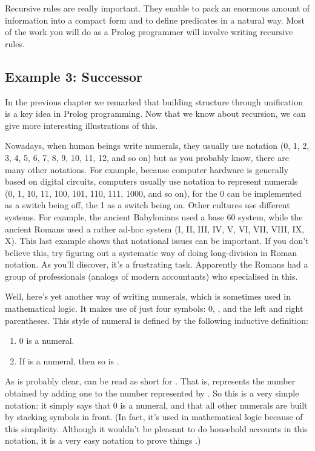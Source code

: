 Recursive rules are really important. They enable to pack an enormous
amount of information into a compact form and to define predicates in
a natural way.  Most of the work you will do as a Prolog programmer
will involve writing recursive rules.

\subsection*{Example 3: Successor}\label{SUBSEC.L3.EX3}



In the previous chapter we remarked that building structure through
unification is a key idea in Prolog programming.  Now that we know
about recursion, we can give more interesting illustrations of this.

Nowadays, when human beings write numerals, they usually use
 notation (0, 1, 2, 3, 4, 5, 6, 7, 8, 9, 10, 11, 12, and
so on) but as you probably know, there are many other notations.  For
example, because computer hardware is generally based on digital
circuits, computers usually use  notation to represent
numerals (0, 1, 10, 11, 100, 101, 110, 111, 1000, and so on), for the
0 can be implemented as a switch being off, the 1 as a switch being
on.  Other cultures use different systems.  For example, the
ancient Babylonians used a base 60 system, while the ancient Romans
used a rather ad-hoc system (I, II, III, IV, V, VI, VII, VIII, IX, X).
This last example shows that notational issues can be important.  If
you don't believe this, try figuring out a systematic way of doing
long-division in Roman notation.  As you'll discover, it's a
frustrating task.  Apparently the Romans had a group of professionals
(analogs of modern accountants) who specialised in this.

Well, here's yet another way of writing numerals, which is
sometimes used in mathematical logic.  It makes use of just four
symbols: 0, , and the left and right parentheses.  This style
of numeral is defined by the following inductive definition:
\begin{enumerate}
\item{}0 is a numeral.

\item{}If  is a numeral, then so is .
\end{enumerate}


As is probably clear,  can be read as short for
. That is,  represents the number obtained by
adding one to the number represented by .  So this is a very
simple notation: it simply says that 0 is a numeral, and that all
other numerals are built by stacking  symbols in front.  (In
fact, it's used in mathematical logic because of this simplicity.
Although it wouldn't be pleasant to do household accounts in this
notation, it is a very easy notation to prove things .)

